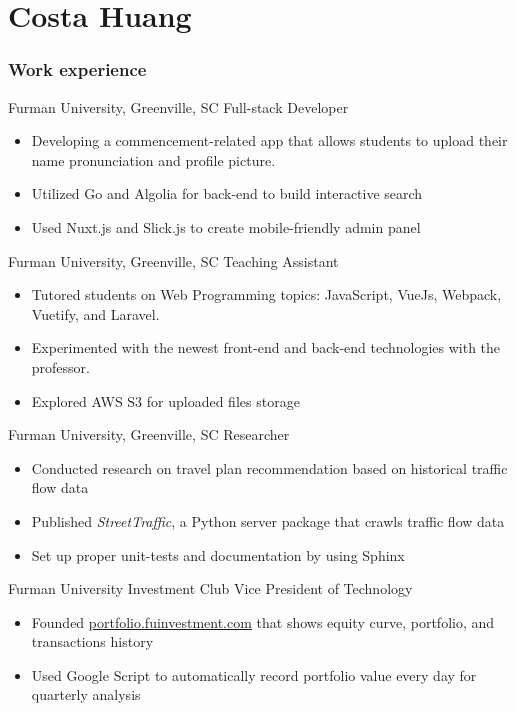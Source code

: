 \documentclass{tccv}
\begin{document}
\part{Costa Huang}

\section{Work experience}

\begin{eventlist}

     {Furman University, Greenville, SC}
     {Full-stack Developer}
\begin{itemize}
    \item Developing a commencement-related app that allows students to 
upload their name pronunciation and profile picture.
    \item Utilized Go and Algolia for back-end to build interactive
search
    \item Used Nuxt.js and Slick.js to create mobile-friendly admin panel
\end{itemize}

     {Furman University, Greenville, SC}
     {Teaching Assistant}
\begin{itemize}
    \item Tutored students on Web Programming topics: JavaScript, VueJs,
Webpack, Vuetify, and Laravel.
    \item Experimented with the newest front-end and back-end
technologies with the professor.
    \item Explored AWS S3 for uploaded files storage
\end{itemize}

     {Furman University, Greenville, SC}
     {Researcher}
\begin{itemize}
    \item Conducted research on travel plan recommendation based on
historical traffic flow data
    \item Published \textit{StreetTraffic}, a Python server package that crawls traffic flow data 
    \item Set up proper unit-tests and documentation by using Sphinx
\end{itemize}

     {Furman University Investment Club}
     {Vice President of Technology}
\begin{itemize}
    \item Founded \href{http://portfolio.fuinvestment.com/}{portfolio.fuinvestment.com} that shows equity
curve, portfolio, and transactions history
    \item Used Google Script to automatically record portfolio value every
day for quarterly analysis
\end{itemize}


\end{eventlist}
\end{document}
